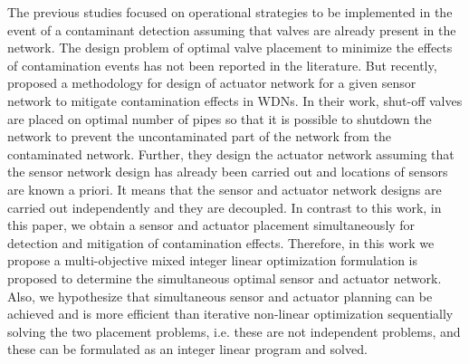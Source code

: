 \documentclass[authoryear,preprint,review,12pt]{elsarticle}
\begin{document}
The previous studies focused on operational strategies to be implemented in the event of a contaminant detection assuming that valves are already present in the network. The design problem of optimal valve placement to minimize  the effects of  contamination events has not been reported in the literature. But recently, \cite{palleti_actuator_2018} proposed a methodology for design of actuator network for a given sensor network to mitigate contamination effects in WDNs. In their work, shut-off valves are placed on optimal number of pipes so that it is possible to shutdown the network to prevent the uncontaminated part of the network from the contaminated network.  Further, they design the actuator network assuming that the sensor network design has already been carried out and locations of sensors are known a priori. It means that the sensor and actuator network designs are carried out independently and they are decoupled.  In contrast to this work, in this paper, we obtain a sensor and actuator placement simultaneously for detection and mitigation of contamination effects.  Therefore, in this work we propose a multi-objective mixed integer linear optimization formulation is proposed to determine the simultaneous optimal sensor and actuator network. Also, we hypothesize that simultaneous sensor and actuator planning can be achieved and is more efficient than iterative non-linear optimization sequentially solving the two placement problems, %
i.e. these are not independent problems, and these can be formulated as an integer linear program and solved.


%
%
%
%
%
\end{document}
